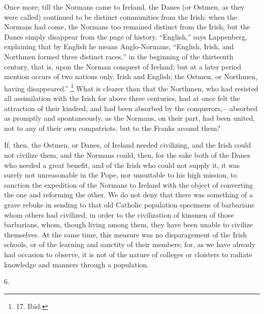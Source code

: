 Once more; till the Normans
came to Ireland, the Danes (or Ostmen, as they were called) continued
to be distinct communities from the Irish: when the Normans had come,
the Normans too remained distinct from the Irish; but the Danes simply
disappear from the page of history. ``English,'' says Lappenberg,
explaining that by English he means Anglo-Normans, ``English, Irish,
and Northmen formed three distinct races,'' in the beginning of the
thirteenth century, that is, upon the Norman conquest of Ireland; but
at a later period mention occurs of two nations only, Irish and
English; the Ostmen, or Northmen, having disappeared.'' \footnote{17.
Ibid.} What is clearer than that the Northmen, who had resisted all
assimilation with the Irish for above three centuries, had at once
felt the attraction of their kindred, and had been absorbed by the
conquerors,—absorbed as promptly and spontaneously, as the Normans,
on their part, had been united, not to any of their own compatriots,
but to the Franks around them?

If, then, the Ostmen, or
Danes, of Ireland needed civilizing, and the Irish could not civilize
them, and the Normans could, then, for the sake both of the Danes who
needed a great benefit, and of the Irish who could not supply it, it
was surely not unreasonable in the Pope, nor unsuitable to his
high mission, to sanction the expedition of the Normans to Ireland
with the object of converting the one and reforming the other. We do
not deny that there was something of a grave rebuke in sending to that
old Catholic population specimens of barbarians whom others had
civilized, in order to the civilization of kinsmen of those
barbarians, whom, though living among them, they have been unable to
civilize themselves. At the same time, this measure was no
disparagement of the Irish schools, or of the learning and sanctity of
their members; for, as we have already had occasion to observe, it is
not of the nature of colleges or cloisters to radiate knowledge and
manners through a population.

6.

